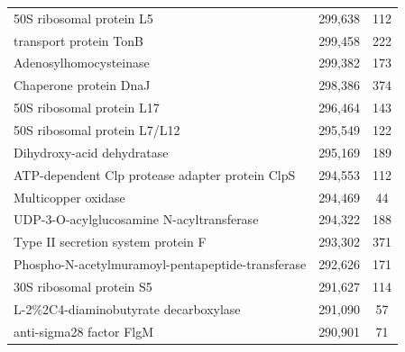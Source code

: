\begin{singlespace}
\begin{longtable}{p{} cc}
                                                                  50S ribosomal protein L5 &                     299,638 &           112 \\
                                                                    transport protein TonB &                     299,458 &           222 \\
                                                                    Adenosylhomocysteinase &                     299,382 &           173 \\
                                                                    Chaperone protein DnaJ &                     298,386 &           374 \\
                                                                 50S ribosomal protein L17 &                     296,464 &           143 \\
                                                              50S ribosomal protein L7/L12 &                     295,549 &           122 \\
                                                                Dihydroxy-acid dehydratase &                     295,169 &           189 \\
                                           ATP-dependent Clp protease adapter protein ClpS &                     294,553 &           112 \\
                                                                       Multicopper oxidase &                     294,469 &            44 \\
                                                 UDP-3-O-acylglucosamine N-acyltransferase &                     294,322 &           188 \\
                                                        Type II secretion system protein F &                     293,302 &           371 \\
                                         Phospho-N-acetylmuramoyl-pentapeptide-transferase &                     292,626 &           171 \\
                                                                  30S ribosomal protein S5 &                     291,627 &           114 \\
                                                     L-2\%2C4-diaminobutyrate decarboxylase &                     291,090 &            57 \\
                                                                  anti-sigma28 factor FlgM &                     290,901 &            71 \\

\end{longtable}
\end{singlespace}
